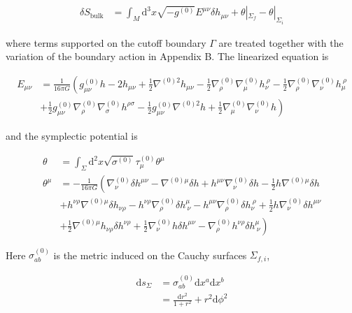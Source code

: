 \begin{align}
\delta S_{\text{bulk}} & =\int _{M}\mathrm{d}^{3}x\sqrt{ -g^{(0)} }E^{\mu \nu}\delta h_{\mu \nu}+\theta|_{\Sigma _{f}}-\theta|_{\Sigma _{i}}
\end{align}

where terms supported on the cutoff boundary \(\Gamma\) are treated together with the variation of the boundary action in Appendix B. The linearized equation is

\begin{align}
E_{\mu \nu} & =\frac{1}{16\pi G}\left(g^{(0)}_{\mu \nu}h-2h_{\mu \nu}+\frac{1}{2}\nabla ^{(0)2}h_{\mu \nu}-\frac{1}{2}\nabla ^{(0)}_{\rho}\nabla ^{(0)}_{\mu}h_{\nu}^{~\rho}-\frac{1}{2}\nabla ^{(0)}_{\rho}\nabla ^{(0)}_{\nu}h_{\mu}^{~\rho}\right. \\
 & \left.+\frac{1}{2}g^{(0)}_{\mu \nu}\nabla ^{(0)}_{\rho}\nabla ^{(0)}_{\sigma}h^{\rho \sigma}-\frac{1}{2}g^{(0)}_{\mu \nu}\nabla ^{(0)2}h+\frac{1}{2}\nabla ^{(0)}_{\mu}\nabla ^{(0)}_{\nu}h\right)
\end{align}

and the symplectic potential is

\begin{align}
\theta & =\int _{\Sigma}\mathrm{d}^{2}x\sqrt{ \sigma ^{(0)} }\tau ^{(0)} _{\mu}\theta ^{\mu} \\
\theta ^{\mu} & =-\frac{1}{16\pi G}\left(\nabla ^{(0)} _{\nu}\delta h^{\mu \nu}-\nabla ^{(0)\mu}\delta h+h^{\mu \nu}\nabla ^{(0)} _{\nu}\delta h-\frac{1}{2}h\nabla ^{(0)\mu}\delta h\right. \\
 & +h^{\nu \rho}\nabla ^{(0)\mu}\delta h_{\nu \rho}-h^{\nu \rho}\nabla ^{(0)}_{\rho}\delta h^{\mu}_{~\nu}-h^{\mu \nu}\nabla ^{(0)}_{\rho}\delta h_{\nu}^{~\rho}+\frac{1}{2}h\nabla ^{(0)}_{\nu}\delta h^{\mu \nu} \\
 & \left.+\frac{1}{2}\nabla ^{(0)\mu}h_{\nu \rho}\delta h^{\nu \rho}+\frac{1}{2}\nabla ^{(0)}_{\nu}h\delta h^{\mu \nu}-\nabla ^{(0)} _{\rho}h^{\nu \rho}\delta h^{\mu}_{~\nu}\right)
\end{align}

Here \(\displaystyle{\sigma ^{(0)} _{ab}}\) is the metric induced on the Cauchy surfaces \(\displaystyle{\Sigma _{f,i}}\),

\begin{align}
\mathrm{d}s_{\Sigma} & =\sigma ^{(0)} _{ab}\mathrm{d}x^{a}\mathrm{d}x^{b} \\
 & =\frac{\mathrm{d}r^{2}}{1+r^{2}}+r^{2}\mathrm{d}\phi ^{2}
\end{align}

